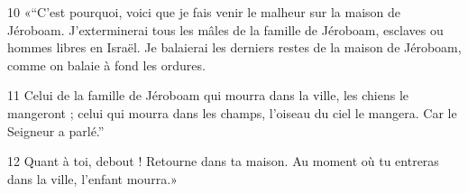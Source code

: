 
10 «“C’est pourquoi, voici que je fais venir le malheur sur la maison de Jéroboam. J’exterminerai tous les mâles de la famille de Jéroboam, esclaves ou hommes libres en Israël. Je balaierai les derniers restes de la maison de Jéroboam, comme on balaie à fond les ordures.

11 Celui de la famille de Jéroboam qui mourra dans la ville, les chiens le mangeront ; celui qui mourra dans les champs, l’oiseau du ciel le mangera. Car le Seigneur a parlé.”

12 Quant à toi, debout ! Retourne dans ta maison. Au moment où tu entreras dans la ville, l’enfant mourra.»